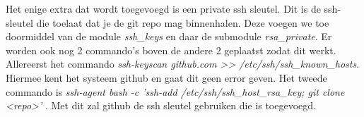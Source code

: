 Het enige extra dat wordt toegevoegd is een private ssh sleutel. Dit is de ssh-sleutel die toelaat dat je de git repo mag binnenhalen. Deze voegen we toe doormiddel van de module \textit{ssh\_keys} en daar de submodule \textit{rsa\_private}. Er worden ook nog 2 commando's boven de andere 2 geplaatst zodat dit werkt. Allereerst het commando \textit{ssh-keyscan github.com >> /etc/ssh/ssh\_known\_hosts}. Hiermee kent het systeem github en gaat dit geen error geven. Het tweede commando is \textit{ssh-agent bash -c 'ssh-add /etc/ssh/ssh\_host\_rsa\_key; git clone <repo>'} . Met dit zal github de ssh sleutel gebruiken die is toegevoegd.
